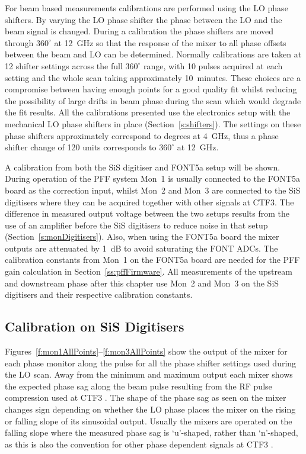 For beam based measurements calibrations are performed using the LO phase shifters. By varying the LO phase shifter the phase between the LO and the beam signal is changed. During a calibration the phase shifters are moved through \(360^\circ\) at 12~GHz  so that the response of the mixer to all phase offsets between the beam and LO can be determined. Normally calibrations are taken at 12 shifter settings across the full \(360^\circ\) range, with 10 pulses acquired at each setting and the whole scan taking approximately 10~minutes. These choices are a compromise between having enough points for a good quality fit whilst reducing the possibility of large drifts in beam phase during the scan which would degrade the fit results. All the calibrations presented use the electronics setup with the mechanical LO phase shifters in place (Section~\ref{s:shifters}). The settings on these phase shifters approximately correspond to degrees at 4~GHz, thus a phase shifter change of 120 units corresponds to \(360^\circ\) at 12~GHz.

A calibration from both the SiS digitiser and FONT5a setup will be shown. During operation of the PFF system Mon~1 is usually connected to the FONT5a board as the correction input, whilst Mon~2 and Mon~3 are connected to the SiS digitisers where they can be acquired together with other signals at CTF3. The difference in measured output voltage between the two setups results from the use of an amplifier before the SiS digitisers to reduce noise in that setup (Section~\ref{s:monDigitisers}). Also, when using the FONT5a board the mixer outputs are attenuated by 1~dB to avoid saturating the FONT ADCs. The calibration constants from Mon~1 on the FONT5a board are needed for the PFF gain calculation in Section~\ref{ss:pffFirmware}. All measurements of the upstream and downstream phase after this chapter use Mon~2 and Mon~3 on the SiS digitisers and their respective calibration constants.

\subsection{Calibration on SiS Digitisers}
\label{ss:SiSCal}

Figures~\ref{f:mon1AllPoints}--\ref{f:mon3AllPoints} show the output of the mixer for each phase monitor along the pulse for all the phase shifter settings used during the LO scan. Away from the minimum and maximum output each mixer shows the expected phase sag along the beam pulse resulting from the RF pulse compression used at CTF3 \cite{rfCompress}. The shape of the phase sag as seen on the mixer changes sign depending on whether the LO phase places the mixer on the rising or falling slope of its sinusoidal output. Usually the mixers are operated on the falling slope where the measured phase sag is `u'-shaped, rather than `n'-shaped, as this is also the convention for other phase dependent signals at CTF3 \cite{piotrPriv}.

